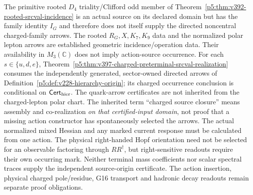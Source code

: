 \documentclass[12pt,a4paper]{article}
\begin{document}
\begin{remark}
\label{p5:rem:v3215-charged-origin-ledger}
The primitive rooted $D_4$ triality/Clifford odd member of
Theorem~\ref{p5:thm:v392-rooted-srcval-incidence} is an actual source
on its declared domain but has the family identity $I_G$ and therefore
does not itself supply the directed noncentral charged-family arrows.
The rooted $R_G,X,K_7,K_9$ data and the normalized polar lepton arrows
are established geometric incidence/operation data.  Their availability
in $M_3(\mathbb C)$ does not imply action-source occurrence.  For each
$s\in\{u,d,e\}$, Theorem~\ref{p5:thm:v397-charged-preterminal-srcval-realization}
consumes the independently generated, sector-owned directed arrows of
Definition~\ref{p5:def:v228-hierarchy-origin}; its charged occurrence
conclusion is conditional on $\mathsf{Cert}_{\rm hier}$.  The quark-arrow
certificates are not inherited from the charged-lepton polar chart.
The inherited term ``charged source closure'' means assembly and
co-realization \emph{on that certified-input domain}, not proof that a
missing action constructor has spontaneously selected the arrows.
The actual normalized mixed Hessian and any marked current response
must be calculated from one action.  The physical right-handed Hopf
orientation need not be selected for an observable factoring through
$RR^\dagger$, but right-sensitive readouts require their own occurring
mark.  Neither terminal mass coefficients nor scalar spectral traces
supply the independent source-origin certificate.  The action insertion,
physical charged pole/residue, G16 transport and hadronic decay readouts
remain separate proof obligations.
\end{remark}


\end{document}
